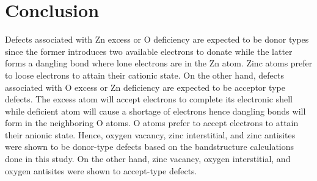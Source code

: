 \chapter{Conclusion} \label{chap:conclu}
Defects associated with Zn excess or O deficiency are expected to be donor types since the former introduces two available electrons to donate while the latter forms a dangling bond where lone electrons are in the Zn atom. Zinc atoms prefer to loose electrons to attain their cationic state. On the other hand, defects associated with O excess or Zn deficiency are expected to be acceptor type defects. The excess  atom will accept electrons to complete its electronic shell while deficient  atom will cause a shortage of electrons hence  dangling bonds will form in the neighboring O atoms. O atoms prefer to accept electrons to attain their anionic state. Hence, oxygen vacancy, zinc interstitial, and zinc antisites were shown to be donor-type defects based on the bandstructure calculations done in this study. On the other hand, zinc vacancy, oxygen interstitial, and oxygen antisites were shown to accept-type defects. 





